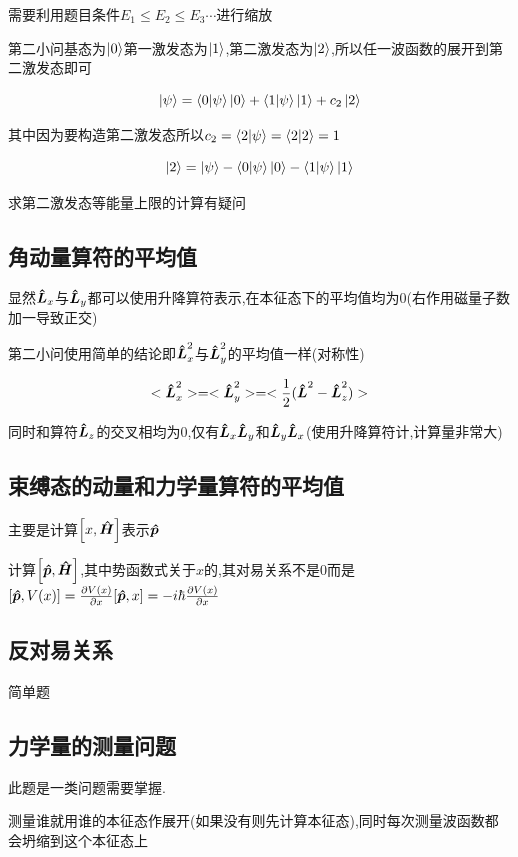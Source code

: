 \documentclass{article}
\begin{document}
            需要利用题目条件$ E_{1} \leq E_{2} \leq E_{3} \cdots $进行缩放

            第二小问基态为$\ket{0}$第一激发态为$\ket{1}$,第二激发态为$\ket{2}$,所以任一波函数的展开到第二激发态即可

            $$ \ket{\psi} = \braket{0}{\psi} \ket{0} + \braket{1}{\psi} \ket{1} + c_{2} \ket{2} $$

            其中因为要构造第二激发态所以$c_{2} = \braket{2}{\psi} = \braket{2}{2} = 1$

            $$   \ket{2} = \ket{\psi} - \braket{0}{\psi} \ket{0} - \braket{1}{\psi} \ket{1} $$
            
            求第二激发态等能量上限的计算有疑问
        
        \subsection{角动量算符的平均值}
            显然$\vu*{L}_{x}$与$\vu*{L}_{y}$都可以使用升降算符表示,在本征态下的平均值均为0(右作用磁量子数加一导致正交)

            第二小问使用简单的结论即$\vu*{L}_{x}^{2}$与$\vu*{L}_{y}^{2}$的平均值一样(对称性)

            $$ <\vu*{L}_{x}^{2}>  = <\vu*{L}_{y}^{2}> = < \frac{1}{2} (\vu*{L}^{2} - \vu*{L}_{z}^{2}) > $$

            同时和算符$\vu*{L}_{z}$的交叉相均为0,仅有$\vu*{L}_{x} \vu*{L}_{y}$和$\vu*{L}_{y} \vu*{L}_{x}$(使用升降算符计,计算量非常大)

        \subsection{束缚态的动量和力学量算符的平均值}
            主要是计算$\comm{x}{\vu*{H}}$表示$\vu*{p}$

            计算$\comm{\vu*{p}}{\vu*{H}}$,其中势函数式关于$x$的,其对易关系不是0而是$\comm{\vu*{p}}{V(x)} = \pdv{V(x)}{x} \comm{\vu*{p}}{x} = -i\hbar \pdv{V(x)}{x}$

        \subsection{反对易关系}
            简单题
        \subsection{力学量的测量问题}
            此题是一类问题需要掌握.
            \begin{formal}
                测量谁就用谁的本征态作展开(如果没有则先计算本征态),同时每次测量波函数都会坍缩到这个本征态上
            \end{formal}
\end{document}
